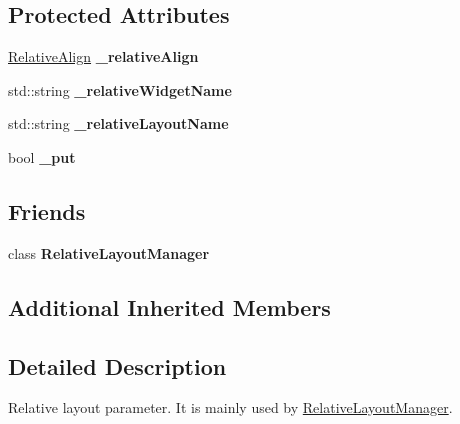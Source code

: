 \subsection*{Protected Attributes}
\begin{DoxyCompactItemize}
\item 
\mbox{\label{classui_1_1RelativeLayoutParameter_a1f4fe4e76cf32da54f80f9c5728df1cf}} 
\hyperlink{classui_1_1RelativeLayoutParameter_a40283d09524c58e61741de3288e6769d}{Relative\+Align} {\bfseries \+\_\+relative\+Align}
\item 
\mbox{\label{classui_1_1RelativeLayoutParameter_a37855e6a00f32fd4582d666f9fda8018}} 
std\+::string {\bfseries \+\_\+relative\+Widget\+Name}
\item 
\mbox{\label{classui_1_1RelativeLayoutParameter_a9c354b8663d206bf7d5e5577238e73e8}} 
std\+::string {\bfseries \+\_\+relative\+Layout\+Name}
\item 
\mbox{\label{classui_1_1RelativeLayoutParameter_a0a1812e6368761d3f55e2c199aee01a4}} 
bool {\bfseries \+\_\+put}
\end{DoxyCompactItemize}
\subsection*{Friends}
\begin{DoxyCompactItemize}
\item 
\mbox{\label{classui_1_1RelativeLayoutParameter_a61ad8b39480850e839047b37cfd83e0c}} 
class {\bfseries Relative\+Layout\+Manager}
\end{DoxyCompactItemize}
\subsection*{Additional Inherited Members}


\subsection{Detailed Description}
Relative layout parameter. It is mainly used by {\ttfamily \hyperlink{classui_1_1RelativeLayoutManager}{Relative\+Layout\+Manager}}. 

